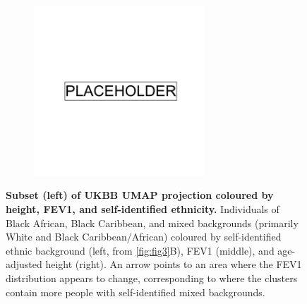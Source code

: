 \newpage

\begin{figure}[ht]
    \centering
    \begin{subfigure}{\textwidth}
    \includegraphics[width=0.7\textwidth]{placeholder.png}
    \end{subfigure}
    \caption[Subset (left) of UKBB UMAP projection coloured by height, FEV1, and self-identified ethnicity]{\textbf{Subset (left) of UKBB UMAP projection coloured by height, FEV1, and self-identified ethnicity.} Individuals of Black African, Black Caribbean, and mixed backgrounds (primarily White and Black Caribbean/African) coloured by self-identified ethnic background (left, from \ref{fig:fig3}B), FEV1 (middle), and age-adjusted height (right). An arrow points to an area where the FEV1 distribution appears to change, corresponding to where the clusters contain more people with self-identified mixed backgrounds.}
    \label{fig:supp_comparison_fev_afr}
\end{figure}

\newpage

